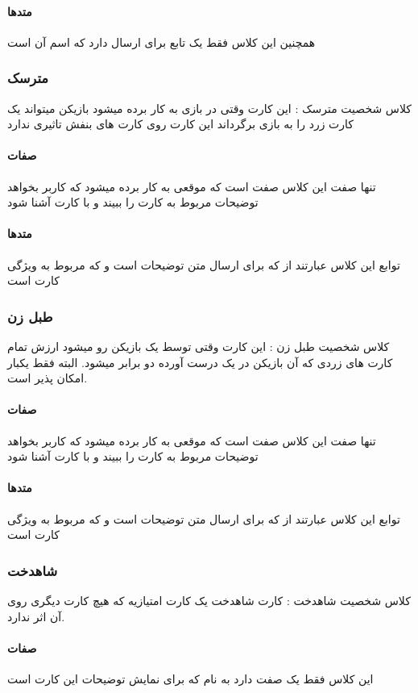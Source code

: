 \documentclass[pdf,titlepage,a4paper]{report}
\begin{document}
	\paragraph{متدها}
	همچنین این کلاس فقط یک تابع برای ارسال  دارد که اسم آن  است
	\subsubsection{مترسک}
	کلاس شخصیت مترسک : این کارت وقتی در بازی به کار برده میشود بازیکن میتواند یک کارت زرد را به بازی برگرداند 
	این کارت روی کارت های بنفش تاثیری ندارد
	\paragraph{صفات}
	 تنها  صفت این کلاس صفت   است که موقعی به کار برده میشود که کاربر بخواهد توضیحات مربوط به کارت را ببیند و با کارت آشنا شود
	 
	 \paragraph{متدها}
	 توابع این کلاس عبارتند از  
	  که برای ارسال متن توضیحات است 
	 و  که مربوط به ویژگی کارت است
	\subsubsection{طبل زن}
	 کلاس شخصیت طبل زن : این کارت وقتی توسط یک بازیکن رو میشود ارزش تمام کارت های زردی که آن بازیکن در یک درست آورده دو برابر میشود. البته فقط یکبار امکان پذیر است.

    \paragraph{صفات}
	تنها  صفت این کلاس صفت   است که موقعی به کار برده میشود که کاربر بخواهد توضیحات مربوط به کارت را ببیند و با کارت آشنا شود
	\paragraph{متدها}
	توابع این کلاس عبارتند از  
	 که برای ارسال متن توضیحات است 
	و  که مربوط به ویژگی کارت است
	\subsubsection{شاهدخت}
	 کلاس شخصیت شاهدخت : کارت شاهدخت یک کارت امتیازیه که هیچ کارت دیگری روی آن اثر ندارد.
	\paragraph{صفات}
	این کلاس فقط یک صفت دارد به نام   که برای نمایش توضیحات این کارت است
\end{document}

